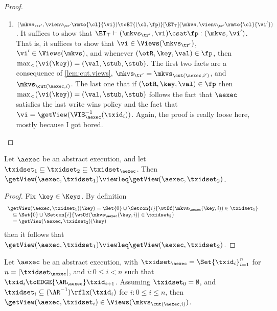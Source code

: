 \begin{proof}
\begin{itemize}
\begin{enumerate}
\item $(\mkvs_{\tr'}, \vienv_{\tr'}\rmto{\cl}{\vi}) \toET{(\cl, \fp)}[\ET_{\top}] (\mkvs,  \vienv_{\tr'}\rmto{\cl}{\vi'})$. 
    It suffices to show that $\ET_{\top} \vdash (\mkvs_{\tr'}, \vi) \csat \fp: (\mkvs,\vi')$. 
That is, it suffices to show that $\vi \in \Views(\mkvs_{\tr'})$, $\vi' \in \Views(\mkvs)$, 
and whenever $(\otR, \key, \val) \in \fp$, then $\max_{<}(\vi(\key)) = (\val, \stub, \stub)$. 
The first two facts are a consequence of \cref{lem:cut.views}, $\mkvs_{\tr'} = \mkvs_{\cut(\aexec, i')}$, and  $\mkvs_{\cut(\aexec, i)}$. 
The last one that if $(\otR, \key, \val) \in \fp$ then $\max_{<}(\vi(\key)) = (\val, \stub, \stub)$ follows the fact that 
$\aexec$ satisfies the last write wins policy and the fact that $\vi = \getView(\VIS^{-1}_{\aexec}(\txid_{i}))$.
\ac{Again, the proof is really loose here, mostly because I got bored.}
\end{enumerate} 

\end{itemize}
\end{proof}

\begin{lemma}
\label{lem:getView.monotone}
Let $\aexec$ be an abstract execution, and let $\txidset_1 \subseteq \txidset_2 \subseteq \txidset_{\aexec}$. 
Then $\getView(\aexec, \txidset_1) \viewleq \getView(\aexec, \txidset_2)$.
\end{lemma}
\begin{proof}
Fix $\key \in \Keys$. By definition  
\[
\begin{array}{l}
    \getView(\aexec, \txidset_1)(\key) = \Set{0} \cup \Setcon{ i }{\wtOf(\mkvs_{\aexec}(\key, i)) \in \txidset_1} \\
    \quad \subseteq \Set{0} \cup \Setcon{i }{ \wtOf(\mkvs_{\aexec}(\key, i)) \in \txidset_2} \\
\quad = \getView(\aexec, \txidset_2)(\key)
\end{array}
\]
then it follows that  $\getView(\aexec, \txidset_1) \viewleq \getView(\aexec, \txidset_2)$.
\end{proof}

\begin{lemma}
\label{lem:cut.views}
Let $\aexec$ be an abstract execution, with $\txidset_{\aexec} = \Set{\txid_{i}}_{i = 1}^{n}$ for 
$n = \lvert \txidset_{\aexec} \rvert$, and \( i : 0 \leq i < n\) such that $\txid_{i} \toEDGE{\AR_{\aexec}} \txid_{i+1}$.
Assuming $\txidset_{0} = \emptyset$, and $\txidset_{i} \subseteq (\AR^{-1})\rflx(\txid_{i})$ for $i : 0 \leq i \leq n$,
then $\getView(\aexec, \txidset_{i}) \in \Views(\mkvs_{\cut(\aexec, i)})$.
\end{lemma}

